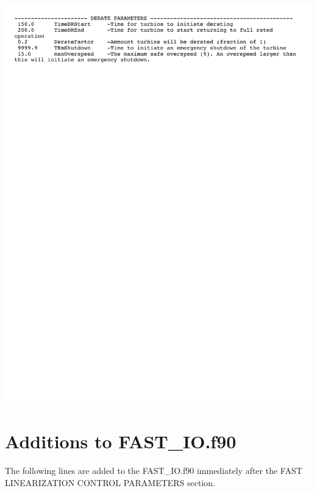 \noindent
\includegraphics[width=.97\linewidth]{Figures/AppendixDFigures/figD-7.pdf}

\section{Additions to FAST\_IO.f90} \label{sectionD-6}

The following lines are added to the FAST\_IO.f90 immediately after the FAST LINEARIZATION CONTROL PARAMETERS section.

